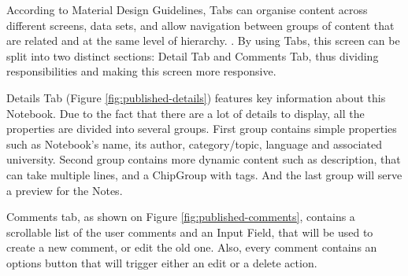 \documentclass[thesis=B,english]{FITthesis}[2012/10/20]
\begin{document}
According to Material Design Guidelines, Tabs can organise content across different screens, data sets, and allow navigation between groups of content that are related and at the same level of hierarchy. \cite{material-tabs}. By using Tabs, this screen can be split into two distinct sections: Detail Tab and Comments Tab, thus dividing responsibilities and making this screen more responsive.
 

Details Tab (Figure \ref{fig:published-details}) features key information about this Notebook. Due to the fact that there are a lot of details to display, all the properties are  divided into several groups. First group contains simple properties such as Notebook's name, its author, category/topic, language and associated university. Second group contains more dynamic content such as description, that can take multiple lines, and a ChipGroup with tags. And the last group will serve a preview for the Notes.


Comments tab, as shown on Figure \ref{fig:published-comments}, contains a scrollable list of the user comments and an Input Field, that will be used to create a new comment, or edit the old one. Also, every comment contains an options button that will trigger either an edit or a delete action.
\end{document}
